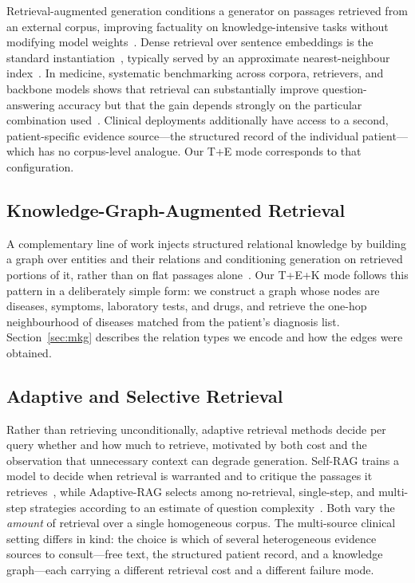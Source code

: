 \documentclass[preprint,12pt]{elsarticle}
\begin{document}
Retrieval-augmented generation conditions a generator on passages
retrieved from an external corpus, improving factuality on
knowledge-intensive tasks without modifying model
weights~\cite{lewis2020}. Dense retrieval over sentence embeddings is
the standard instantiation~\cite{reimers2019}, typically served by an
approximate nearest-neighbour index~\cite{johnson2019}. In medicine, systematic benchmarking across
corpora, retrievers, and backbone models shows that retrieval can
substantially improve question-answering accuracy but that the gain
depends strongly on the particular combination
used~\cite{xiong2024}. Clinical deployments additionally have access
to a second, patient-specific evidence source---the structured record
of the individual patient---which has no corpus-level analogue. Our
T+E mode corresponds to that configuration.

\subsection{Knowledge-Graph-Augmented Retrieval}

A complementary line of work injects structured relational knowledge
by building a graph over entities and their relations and conditioning
generation on retrieved portions of it, rather than on flat passages
alone~\cite{edge2024}. Our T+E+K mode follows this pattern in a
deliberately simple form: we construct a graph whose nodes are
diseases, symptoms, laboratory tests, and drugs, and retrieve the
one-hop neighbourhood of diseases matched from the patient's diagnosis
list. Section~\ref{sec:mkg} describes the relation types we encode and
how the edges were obtained.

\subsection{Adaptive and Selective Retrieval}

Rather than retrieving unconditionally, adaptive retrieval methods
decide per query whether and how much to retrieve, motivated by both
cost and the observation that unnecessary context can degrade
generation. Self-RAG trains a model to decide when retrieval is
warranted and to critique the passages it
retrieves~\cite{asai2024}, while Adaptive-RAG selects among
no-retrieval, single-step, and multi-step strategies according to an
estimate of question complexity~\cite{jeong2024}. Both vary the
\textit{amount} of retrieval over a single homogeneous corpus. The
multi-source clinical setting differs in kind: the choice is which of
several heterogeneous evidence sources to consult---free text, the
structured patient record, and a knowledge graph---each carrying a
different retrieval cost and a different failure mode.
\end{document}
